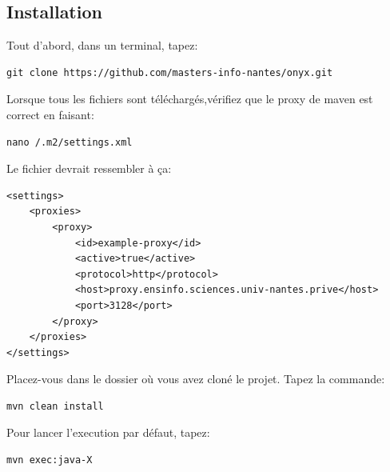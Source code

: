 \subsection{Installation}

Tout d’abord, dans un terminal, tapez:
\begin{verbatim}
git clone https://github.com/masters-info-nantes/onyx.git
\end{verbatim}

Lorsque tous les fichiers sont téléchargés,vérifiez que le proxy de maven est correct en faisant:
\begin{verbatim}
nano /.m2/settings.xml
\end{verbatim}

Le fichier devrait ressembler à ça:
\begin{verbatim}
<settings>
    <proxies>
        <proxy>
            <id>example-proxy</id>
            <active>true</active>
            <protocol>http</protocol>
            <host>proxy.ensinfo.sciences.univ-nantes.prive</host>
            <port>3128</port>
        </proxy>
    </proxies>
</settings>
\end{verbatim}

Placez-vous dans le dossier où vous avez cloné le projet. 
Tapez la commande:
\begin{verbatim}
mvn clean install
\end{verbatim}

Pour lancer l'execution par défaut, tapez:
\begin{verbatim}
mvn exec:java-X
\end{verbatim}
